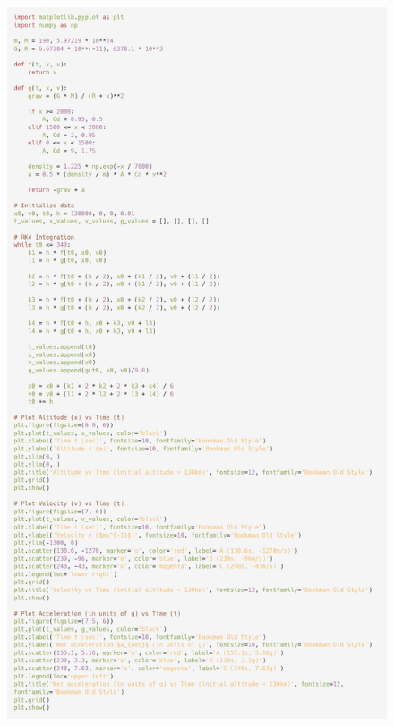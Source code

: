 \documentclass[a4paper, 14pt]{extarticle}
\begin{document}
\begin{figure}[H]
\centering
\includegraphics[width=0.87\linewidth]{4.png}
\caption*{}
\end{figure}
\end{document}
